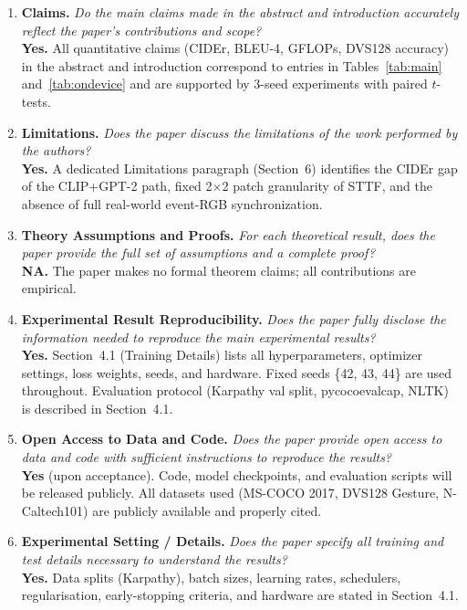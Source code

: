 \documentclass{article}
\begin{document}
\begin{enumerate}

\item \textbf{Claims.}
\textit{Do the main claims made in the abstract and introduction accurately reflect the paper's contributions and scope?}\\
\textbf{Yes.} All quantitative claims (CIDEr, BLEU-4, GFLOPs, DVS128 accuracy) in the abstract and introduction correspond to entries in Tables~\ref{tab:main} and~\ref{tab:ondevice} and are supported by 3-seed experiments with paired $t$-tests.

\item \textbf{Limitations.}
\textit{Does the paper discuss the limitations of the work performed by the authors?}\\
\textbf{Yes.} A dedicated Limitations paragraph (Section~6) identifies the CIDEr gap of the CLIP+GPT-2 path, fixed 2$\times$2 patch granularity of STTF, and the absence of full real-world event-RGB synchronization.

\item \textbf{Theory Assumptions and Proofs.}
\textit{For each theoretical result, does the paper provide the full set of assumptions and a complete proof?}\\
\textbf{NA.} The paper makes no formal theorem claims; all contributions are empirical.

\item \textbf{Experimental Result Reproducibility.}
\textit{Does the paper fully disclose the information needed to reproduce the main experimental results?}\\
\textbf{Yes.} Section~4.1 (Training Details) lists all hyperparameters, optimizer settings, loss weights, seeds, and hardware. Fixed seeds \{42, 43, 44\} are used throughout. Evaluation protocol (Karpathy val split, pycocoevalcap, NLTK) is described in Section~4.1.

\item \textbf{Open Access to Data and Code.}
\textit{Does the paper provide open access to data and code with sufficient instructions to reproduce the results?}\\
\textbf{Yes} (upon acceptance). Code, model checkpoints, and evaluation scripts will be released publicly. All datasets used (MS-COCO 2017, DVS128 Gesture, N-Caltech101) are publicly available and properly cited.

\item \textbf{Experimental Setting / Details.}
\textit{Does the paper specify all training and test details necessary to understand the results?}\\
\textbf{Yes.} Data splits (Karpathy), batch sizes, learning rates, schedulers, regularisation, early-stopping criteria, and hardware are stated in Section~4.1.


\end{enumerate}
\end{document}

